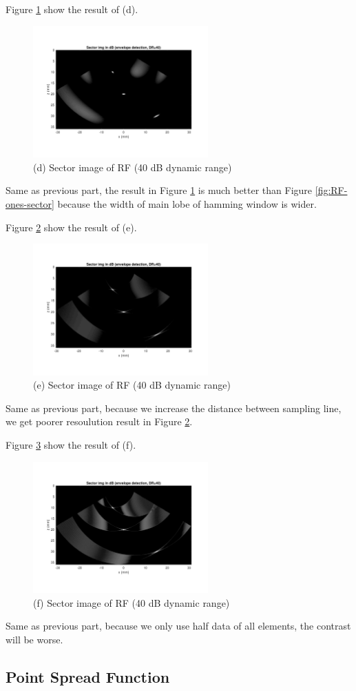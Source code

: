 \documentclass{article}
\begin{document}
Figure \ref{fig:RF-hanning-sector} show the result of (d).
\begin{figure}[H]
    \centering
    \includegraphics[width=0.6\textwidth]{src/RF/b-9-hanning.pdf}
    \caption{(d) Sector image of RF (40 dB dynamic range)}
    \label{fig:RF-hanning-sector}
\end{figure}
Same as previous part, the result in Figure \ref{fig:RF-hanning-sector} is much better than Figure \ref{fig:RF-ones-sector} because
the width of main lobe of hamming window is wider.

Figure \ref{fig:RF-2pitch-sector} show the result of (e).
\begin{figure}[H]
    \centering
    \includegraphics[width=0.6\textwidth]{src/RF/b-9-2pitch.pdf}
    \caption{(e) Sector image of RF (40 dB dynamic range)}
    \label{fig:RF-2pitch-sector}
\end{figure}
Same as previous part, because we increase the distance between sampling line, we get poorer resoulution result in 
Figure \ref{fig:RF-2pitch-sector}.

Figure \ref{fig:RF-everyones-sector} show the result of (f).
\begin{figure}[H]
    \centering
    \includegraphics[width=0.6\textwidth]{src/RF/b-9-everyones.pdf}
    \caption{(f) Sector image of RF (40 dB dynamic range)}
    \label{fig:RF-everyones-sector}
\end{figure}
Same as previous part, because we only use half data of all elements, the contrast will be worse.

\subsection{Point Spread Function}
\end{document}
